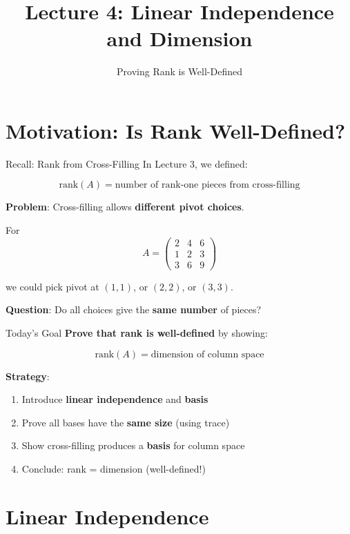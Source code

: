 \documentclass[10pt]{beamer}
\title{Lecture 4: Linear Independence and Dimension}
\subtitle{Proving Rank is Well-Defined}
\date{}
\theoremstyle{definition}
\newcommand{\x}[1]{\alert{\textbf{#1}}}
\begin{document}
\maketitle

\section{Motivation: Is Rank Well-Defined?}

\begin{frame}{Recall: Rank from Cross-Filling}
In Lecture 3, we defined:

$$\text{rank}(A) = \text{number of rank-one pieces from cross-filling}$$

\vfill
\x{Problem}: Cross-filling allows \x{different pivot choices}.

\vfill
For
$$A = \begin{pmatrix} 2 & 4 & 6 \\ 1 & 2 & 3 \\ 3 & 6 & 9 \end{pmatrix}$$

we could pick pivot at $(1,1)$, or $(2,2)$, or $(3,3)$.

\vfill
\x{Question}: Do all choices give the \x{same number} of pieces?
\end{frame}

\begin{frame}{Today's Goal}
\x{Prove that rank is well-defined} by showing:

$$\boxed{\text{rank}(A) = \text{dimension of column space}}$$

\vfill
\textbf{Strategy}:
\begin{enumerate}
\item Introduce \x{linear independence} and \x{basis}
\item Prove all bases have the \x{same size} (using trace)
\item Show cross-filling produces a \x{basis} for column space
\item Conclude: rank = dimension (well-defined!)
\end{enumerate}
\end{frame}

\section{Linear Independence}
\end{document}
